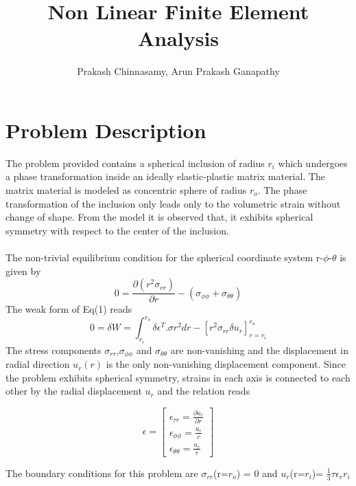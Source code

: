 \documentclass[a4paper,12pt]{article}
\title{\textbf{Non Linear Finite Element Analysis}}
\author{Prakash Chinnasamy, Arun Prakash Ganapathy}
\begin{document}
\maketitle


\newpage
\section*{Problem Description}
\indent \indent  The problem provided contains a spherical inclusion of radius $r_i$ which undergoes a phase transformation inside an ideally elastic-plastic matrix material. The matrix material is modeled as concentric sphere of radius $r_o$. The phase transformation of the inclusion only leads only to the volumetric strain without change of shape. From the model it is observed that, it exhibits spherical symmetry with respect to the center of the inclusion.\\
\\
 The non-trivial equilibrium condition for the spherical coordinate system r-$\phi$-$\theta$ is given by 
\begin{equation}
0 = \frac{\partial (r^2\sigma_{rr})}{\partial r} - (\sigma_{\phi\phi}+\sigma_{\theta\theta})
\label{strongform}
\end{equation}
The weak form of Eq(1) reads 
\begin{equation}
0 = \delta W = \int_{r_i}^{r_o} \delta\epsilon^T . \sigma r^2 dr - [r^2\sigma_{rr}\delta u_r]_{r=r_i}^{r_o}
\label{weakform}
\end{equation}
The stress components $\sigma_{rr}$,$\sigma_{\phi\phi}$ and $\sigma_{\theta\theta}$ are non-vanishing and the displacement in radial direction $u_r(r)$ is the only non-vanishing displacement component. Since the problem exhibits spherical symmetry, strains in each axis is connected to each other by the radial displacement $u_r$ and the relation reads 

\begin{equation}
\epsilon = \begin{bmatrix}
\epsilon_{rr} = \frac{\partial u_r }{\partial r}\\
\epsilon_{\phi\phi} = \frac{u_r}{r}\\
\epsilon_{\theta\theta} = \frac{u_r}{r}
\end{bmatrix}
\label{strain matrix}
\end{equation}


The boundary conditions for this problem are $\sigma_{rr}$(r=$r_o$) = 0 and $u_r$(r=$r_i$)= $\frac{1}{3}\tau\epsilon_{v}r_{i}$ 
\end{document}
